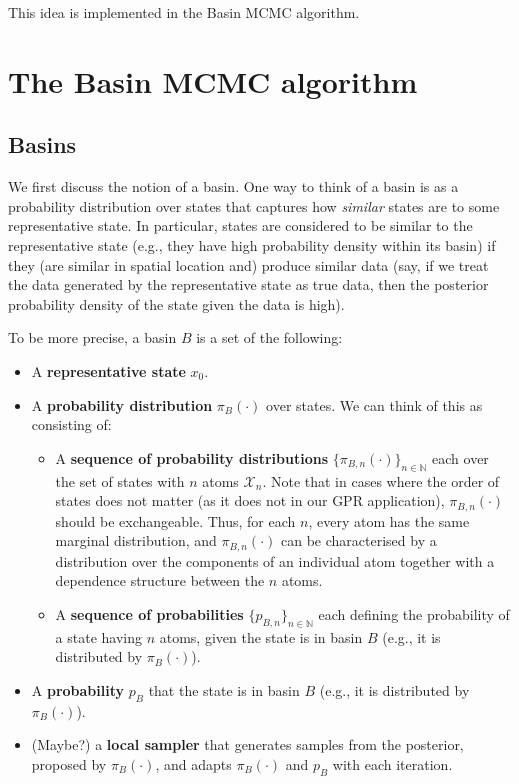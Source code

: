 \documentclass[12pt]{article}
\newcommand*{\N}{\mathbb N}
\theoremstyle{definition}
\theoremstyle{remark}
\theoremstyle{plain}
\begin{document}
This idea is implemented in the Basin MCMC algorithm.


\section{The Basin MCMC algorithm}

\subsection{Basins}
We first discuss the notion of a basin. 
One way to think of a basin is as a probability distribution over states 
that captures how \textit{similar} states are to some representative state.
In particular, states are considered to be similar to the representative state 
(e.g., they have high probability density within its basin) 
if they (are similar in spatial location and) produce similar data (say, if we treat the data generated by the representative state as true data, 
then the posterior probability density of the state given the data is high).

To be more precise, a basin $B$ is a set of the following:
\begin{itemize}
    \item A \textbf{representative state} $x_0$.
    \item A \textbf{probability distribution} $\pi_{B}(\cdot)$ over states. We can think of this as consisting of:
    \begin{itemize}
      \item A \textbf{sequence of probability distributions} $\{\pi_{B,n}(\cdot)\}_{n \in \N}$ each over the set of states with $n$ atoms $\mathcal{X}_n$. 
      Note that in cases where the order of states does not matter (as it does not in our GPR application), 
      $\pi_{B,n}(\cdot)$ should be exchangeable. 
      Thus, for each $n$, every atom has the same marginal distribution, 
      and $\pi_{B,n}(\cdot)$ can be characterised by a distribution over the components of an 
      individual atom together with a dependence structure between the $n$ atoms.
      \item A \textbf{sequence of probabilities} $\{p_{B,n}\}_{n \in \N}$ each defining the probability of a state having $n$ atoms, given the state is in basin $B$ (e.g., it is distributed by $\pi_{B}(\cdot)$).
    \end{itemize}
    \item A \textbf{probability} $p_B$ that the state is in basin $B$ (e.g., it is distributed by $\pi_{B}(\cdot)$).
    \item (Maybe?) a \textbf{local sampler} that generates samples from the posterior, proposed by $\pi_{B}(\cdot)$, 
    and adapts $\pi_{B}(\cdot)$ and $p_B$ with each iteration.
\end{itemize}
\end{document}
